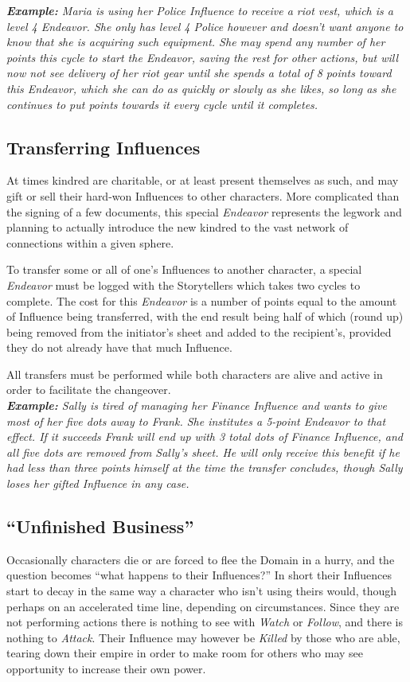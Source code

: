 \emph{\textbf{Example:} Maria is using her \emph{Police} Influence to receive a riot vest, which is a level 
4 \emph{Endeavor}.  She only has level 4 \emph{Police} however and doesn't want anyone to know that she is 
acquiring such equipment.  She may spend any number of her points this cycle to start the \emph{Endeavor}, 
saving the rest for other actions, but will now not see delivery of her riot gear until she spends a total of 
8 points toward this \emph{Endeavor}, which she can do as quickly or slowly as she likes, so long as she 
continues to put points towards it every cycle until it completes.}

\subsection{Transferring Influences}
At times kindred are charitable, or at least present themselves as such, and may gift or sell their hard-won 
Influences to other characters.  More complicated than the signing of a few documents, this special \emph{Endeavor} 
represents the legwork and planning to actually introduce the new kindred to the vast network of connections within 
a given sphere. 

To transfer some or all of one's Influences to another character, a special \emph{Endeavor} must be logged 
with the Storytellers which takes two cycles to complete.  The cost for this \emph{Endeavor} is a number of points 
equal to the amount of Influence being transferred, with the end result being half of which (round up) being removed 
from the initiator's sheet and added to the recipient's, provided they do not already have that much Influence.

All transfers must be performed while both characters are alive and active in order to facilitate the changeover. \\

\emph{\textbf{Example:} Sally is tired of managing her \emph{Finance} Influence and wants to give most of her
five dots away to Frank.  She institutes a 5-point \emph{Endeavor} to that effect. If it succeeds Frank will end 
up with 3 total dots of \emph{Finance} Influence, and all five dots are removed from Sally's sheet.  He will only 
receive this benefit if he had less than three points himself at the time the transfer concludes, though Sally 
loses her gifted Influence in any case.}

\subsection{``Unfinished Business''}
Occasionally characters die or are forced to flee the Domain in a hurry, and the question becomes ``what happens 
to their Influences?''  In short their Influences start to decay in the same way a character who isn't using theirs 
would, though perhaps on an accelerated time line, depending on circumstances.  Since they are not performing 
actions there is nothing to see with \emph{Watch} or \emph{Follow}, and there is nothing to \emph{Attack}. Their 
Influence may however be \emph{Killed} by those who are able, tearing down their empire in order to make room for 
others who may see opportunity to increase their own power.

